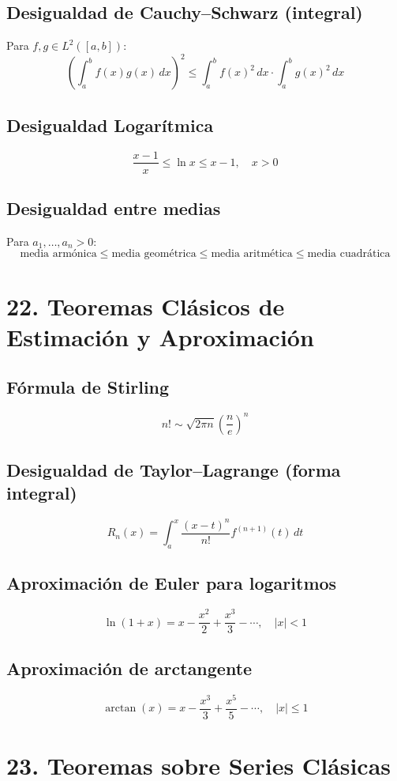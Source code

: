 \documentclass[12pt]{article}
\begin{document}
\subsection{Desigualdad de Cauchy–Schwarz (integral)}
Para \(f, g \in L^2([a,b])\):
\[
\left( \int_a^b f(x)g(x)\,dx \right)^2 \leq \int_a^b f(x)^2\,dx \cdot \int_a^b g(x)^2\,dx
\]

\subsection{Desigualdad Logarítmica}
\[
\frac{x - 1}{x} \leq \ln x \leq x - 1,\quad x > 0
\]

\subsection{Desigualdad entre medias}
Para \(a_1, \dots, a_n > 0\):
\[
\text{media armónica} \leq \text{media geométrica} \leq \text{media aritmética} \leq \text{media cuadrática}
\]

\section{22. Teoremas Clásicos de Estimación y Aproximación}

\subsection{Fórmula de Stirling}
\[
n! \sim \sqrt{2\pi n} \left( \frac{n}{e} \right)^n
\]

\subsection{Desigualdad de Taylor–Lagrange (forma integral)}
\[
R_n(x) = \int_a^x \frac{(x-t)^n}{n!} f^{(n+1)}(t)\,dt
\]

\subsection{Aproximación de Euler para logaritmos}
\[
\ln(1 + x) = x - \frac{x^2}{2} + \frac{x^3}{3} - \cdots,\quad |x| < 1
\]

\subsection{Aproximación de arctangente}
\[
\arctan(x) = x - \frac{x^3}{3} + \frac{x^5}{5} - \cdots,\quad |x| \leq 1
\]

\section{23. Teoremas sobre Series Clásicas}
\end{document}
